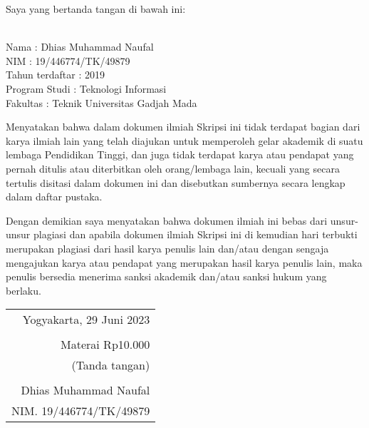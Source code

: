 \noindent Saya yang bertanda tangan di bawah ini:

\vspace{-1em}

\begin{tabbing}
\hspace{40mm} \= \\ %
\noindent Nama \> : Dhias Muhammad Naufal\\[\parskip]
\noindent NIM \> : 19/446774/TK/49879\\[\parskip]
\noindent Tahun terdaftar \> : 2019\\[\parskip]
\noindent Program Studi \> : Teknologi Informasi\\[\parskip]
\noindent Fakultas \> : Teknik Universitas Gadjah Mada
\end{tabbing}

\noindent Menyatakan bahwa dalam dokumen ilmiah Skripsi ini tidak terdapat bagian dari karya ilmiah lain yang telah diajukan untuk memperoleh gelar akademik di suatu lembaga Pendidikan Tinggi, dan juga tidak terdapat karya atau pendapat yang pernah ditulis atau diterbitkan oleh orang/lembaga lain, kecuali yang secara tertulis disitasi dalam dokumen ini dan disebutkan sumbernya secara lengkap dalam daftar pustaka.

\noindent Dengan demikian saya menyatakan bahwa dokumen ilmiah ini bebas dari unsur-unsur plagiasi dan apabila dokumen ilmiah Skripsi ini di kemudian hari terbukti merupakan plagiasi dari hasil karya penulis lain dan/atau dengan sengaja mengajukan karya atau pendapat yang merupakan hasil karya penulis lain, maka penulis bersedia menerima sanksi akademik dan/atau sanksi hukum yang berlaku.


\begin{flushright}
	\begin{tabular}{r}
		Yogyakarta, 29 Juni 2023 \\
		\vspace{0.1cm} \\
		\tiny{Materai Rp10.000} \\
		\tiny{(Tanda tangan)} \\	
		\vspace{0.1cm} \\
		Dhias Muhammad Naufal \\ NIM. 19/446774/TK/49879
	\end{tabular}
\end{flushright}